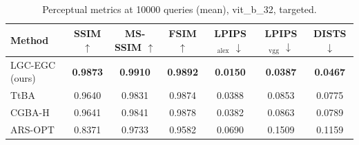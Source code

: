 \begin{table}[t]
\centering\footnotesize
\caption{Perceptual metrics at 10000 queries (mean), vit\_b\_32, targeted.}
\begin{tabular}{lcccccc}
\toprule
Method & SSIM $\uparrow$ & MS-SSIM $\uparrow$ & FSIM $\uparrow$ & LPIPS$_{\mathrm{alex}}$ $\downarrow$ & LPIPS$_{\mathrm{vgg}}$ $\downarrow$ & DISTS $\downarrow$ \\
\midrule
LGC-EGC (ours) & \textbf{0.9873} & \textbf{0.9910} & \textbf{0.9892} & \textbf{0.0150} & \textbf{0.0387} & \textbf{0.0467} \\
TtBA & 0.9640 & 0.9831 & 0.9874 & 0.0388 & 0.0853 & 0.0775 \\
CGBA-H & 0.9641 & 0.9841 & 0.9878 & 0.0382 & 0.0863 & 0.0789 \\
ARS-OPT & 0.8371 & 0.9733 & 0.9582 & 0.0690 & 0.1509 & 0.1159 \\
\bottomrule
\end{tabular}
\end{table}
